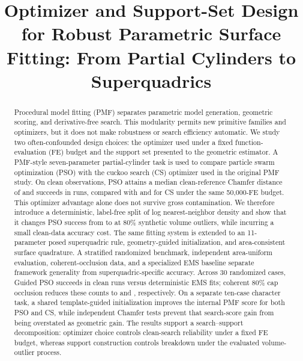 \documentclass[conference]{IEEEtran}
\title{Optimizer and Support-Set Design for Robust Parametric Surface Fitting:
From Partial Cylinders to Superquadrics}
\author{
\IEEEauthorblockN{Anonymous Author(s)}}
\begin{document}
\raggedbottom
\maketitle

\begin{abstract}
Procedural model fitting (PMF) separates parametric model generation, geometric
scoring, and derivative-free search.  This modularity permits new primitive
families and optimizers, but it does not make robustness or search efficiency
automatic.  We study two often-confounded design choices: the optimizer used
under a fixed function-evaluation (FE) budget and the support set presented to
the geometric estimator.  A PMF-style seven-parameter partial-cylinder task is
used to compare particle swarm optimization (PSO) with the cuckoo search (CS)
optimizer used in the original PMF study.  On clean observations, PSO attains a
median clean-reference Chamfer distance of \PMFCleanPSOMedian{} and succeeds in
\PMFCleanPSOSuccess{} runs, compared with \PMFCleanCSMedian{} and
\PMFCleanCSSuccess{} for CS under the same 50,000-FE budget.  This optimizer
advantage alone does not survive gross contamination.  We therefore introduce
a deterministic, label-free split of log nearest-neighbor density and show that
it changes PSO success from \SupportOutlierEightyFullSuccess{} to
\SupportOutlierEightyAdaptiveSuccess{} at 80\% synthetic volume outliers, while
incurring a small clean-data accuracy cost.  The same fitting system is extended
to an 11-parameter posed superquadric rule, geometry-guided initialization, and
area-consistent surface quadrature.  A stratified randomized benchmark,
independent area-uniform evaluation, coherent-occlusion data, and a specialized
EMS baseline separate framework generality from superquadric-specific accuracy.
Across 30 randomized cases, Guided PSO succeeds in \SQRandomPSOSuccess{} clean
runs versus \SQRandomEMSSuccess{} deterministic EMS fits; coherent 80\% cap
occlusion reduces these counts to \SQOcclusionPSOSuccess{} and
\SQOcclusionEMSSuccess{}, respectively.
On a separate ten-case character task, a shared template-guided initialization
improves the internal PMF score for both PSO and CS, while independent Chamfer
tests prevent that search-score gain from being overstated as geometric gain.
The results support a search--support decomposition: optimizer choice controls
clean-search reliability under a fixed FE budget, whereas support construction
controls breakdown under the evaluated volume-outlier process.
\end{abstract}
\end{document}
